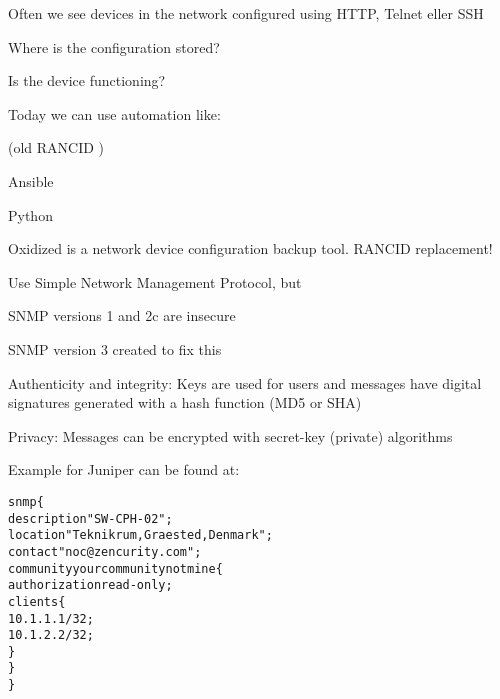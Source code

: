 \documentclass[Screen16to9,17pt]{foils}
\begin{document}

\begin{list1}
\item Often we see devices in the network configured using HTTP, Telnet eller SSH
\begin{list2}
\item Where is the configuration stored?
\item Is the device functioning?
\end{list2}
\item Today we can use automation like:
\begin{list2}
\item (old RANCID )
\item Ansible 
\item Python
\item Oxidized is a network device configuration backup tool. RANCID replacement!
\\
\end{list2}
\end{list1}



Use Simple Network Management Protocol, but
\begin{list2}
\item SNMP versions 1 and 2c are insecure
\item SNMP version 3 created to fix this
\item Authenticity and integrity: Keys are used for
users and messages have digital signatures
generated with a hash function (MD5 or SHA)
\item Privacy: Messages can be encrypted with
secret-key (private) algorithms
\end{list2}

Example for Juniper can be found at:\\
{\small{}}




\begin{alltt}
snmp \{
    description "SW-CPH-02";
    location "Teknikrum, Graested, Denmark";
    contact "noc@zencurity.com";
    community yourcommunitynotmine \{
        authorization read-only;
        clients \{
            10.1.1.1/32;
            10.1.2.2/32;
        \}
    \}
\}
\end{alltt}
\end{document}
